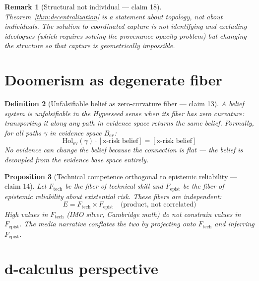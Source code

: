 \documentclass[11pt,a4paper]{article}
\newtheorem{definition}{Definition}[section]
\newtheorem{proposition}[definition]{Proposition}
\newtheorem{remark}[definition]{Remark}
\begin{document}
\begin{remark}[Structural not individual --- claim 18]
Theorem~\ref{thm:decentralization} is a statement about topology, not about
individuals. The solution to coordinated capture is not identifying and
excluding ideologues (which requires solving the provenance-opacity problem)
but changing the structure so that capture is geometrically impossible.
\end{remark}

\section{Doomerism as degenerate fiber}
\label{sec:doomerism}

\begin{definition}[Unfalsifiable belief as zero-curvature fiber --- claim 13]
\label{def:unfalsifiable}
A belief system is \emph{unfalsifiable} in the Hyperseed sense when its fiber
has zero curvature: transporting it along any path in evidence space returns
the same belief. Formally, for all paths $\gamma$ in evidence space $B_{\text{ev}}$:
\[
  \mathrm{Hol}_{\text{ev}}(\gamma) \cdot [\text{x-risk belief}]
  = [\text{x-risk belief}]
\]
No evidence can change the belief because the connection is flat --- the
belief is decoupled from the evidence base space entirely.
\end{definition}

\begin{proposition}[Technical competence orthogonal to epistemic reliability --- claim 14]
\label{prop:competence}
Let $F_{\text{tech}}$ be the fiber of technical skill and $F_{\text{epist}}$
be the fiber of epistemic reliability about existential risk. These fibers
are independent:
\[
  E = F_{\text{tech}} \times F_{\text{epist}} \quad \text{(product, not correlated)}
\]
High values in $F_{\text{tech}}$ (IMO silver, Cambridge math) do not constrain
values in $F_{\text{epist}}$. The media narrative conflates the two by
projecting onto $F_{\text{tech}}$ and inferring $F_{\text{epist}}$.
\end{proposition}

\section{d-calculus perspective}
\label{sec:d-calc}
\end{document}
